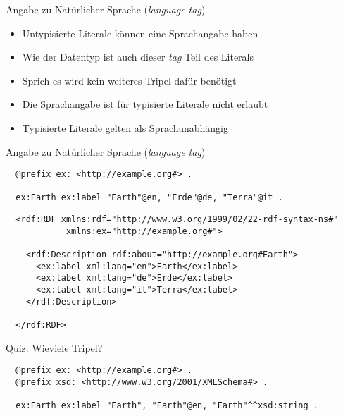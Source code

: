 \documentclass{beamer}
\begin{document}
\begin{frame}{Angabe zu Natürlicher Sprache (\emph{language tag})}
	
	\begin{itemize}
		\item Untypisierte Literale können eine Sprachangabe haben
		\item Wie der Datentyp ist auch dieser \emph{tag} Teil des Literals
		\item Sprich es wird kein weiteres Tripel dafür benötigt
		\item Die Sprachangabe ist für typisierte Literale nicht erlaubt
		\item Typisierte Literale gelten als Sprachunabhängig
	\end{itemize}
	
\end{frame}

\begin{frame}[fragile]{Angabe zu Natürlicher Sprache (\emph{language tag})}
	
	\small
	\begin{lstlisting}
  @prefix ex: <http://example.org#> .
	
  ex:Earth ex:label "Earth"@en, "Erde"@de, "Terra"@it .
	\end{lstlisting}
	
	\vspace{1cm}
	
	\small
	\begin{lstlisting}	
  <rdf:RDF xmlns:rdf="http://www.w3.org/1999/02/22-rdf-syntax-ns#"
            xmlns:ex="http://example.org#">

    <rdf:Description rdf:about="http://example.org#Earth">
      <ex:label xml:lang="en">Earth</ex:label>
      <ex:label xml:lang="de">Erde</ex:label>
      <ex:label xml:lang="it">Terra</ex:label>
    </rdf:Description>

  </rdf:RDF>		
	\end{lstlisting}
	
\end{frame}

\begin{frame}[fragile]{Quiz: Wieviele Tripel?}
	
	\small
	\begin{lstlisting}
  @prefix ex: <http://example.org#> .
  @prefix xsd: <http://www.w3.org/2001/XMLSchema#> . 
	
  ex:Earth ex:label "Earth", "Earth"@en, "Earth"^^xsd:string .
	\end{lstlisting}
	
\end{frame}
\end{document}
